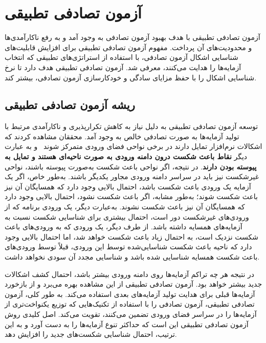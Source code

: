 \section{آزمون تصادفی تطبیقی}
آزمون تصادفی تطبیقی
 \cite{huang2019survey}
   با هدف بهبود آزمون تصادفی به وجود آمد و به رفع ناکارآمدی‌ها و محدودیت‌های آن پرداخت. مفهوم آزمون تصادفی تطبیقی برای افزایش قابلیت‌های شناسایی اشکال آزمون تصادفی، با استفاده از استراتژی‌های تطبیقی که انتخاب آزمایه‌ها را هدایت می‌کنند، معرفی شد. آزمون تصادفی تطبیقی هدف دارد تا نرخ شناسایی اشکال را با حفظ مزایای سادگی و خودکارسازی آزمون تصادفی، بیشتر کند.

\subsection{ریشه آزمون تصادفی تطبیقی}

توسعه آزمون تصادفی تطبیقی به دلیل نیاز به کاهش تکرارپذیری و ناکارآمدی مرتبط با تولید آزمایه‌ها به صورت تصادفی خالص به وجود آمد. محققان مشاهده کردند که اشکالات نرم‌افزار تمایل دارند در برخی نواحی فضای ورودی متمرکز شوند~\cite{white1980domain}\cite{ammann1988data}\cite{finelli1991nasa}\cite{bishopvariation}\cite{schneckenburger2007towards}
 و به عبارت دیگر \textbf{نقاط باعث شکست درون دامنه ورودی به صورت ناحیه‌ای هستند و تمایل به پیوسته بودن دارند}.
در نتیجه، اگر نواحی باعث شکست به‌صورت پیوسته باشند، نواحی غیرشکست نیز باید در سراسر دامنه ورودی مجاور یکدیگر باشند. به‌طور خاص، اگر یک آزمایه  یک ورودی باعث شکست باشد، احتمال بالایی وجود دارد که همسایگان آن نیز باعث شکست شوند؛ به‌طور مشابه، اگر  باعث شکست نشود، احتمال بالایی وجود دارد که همسایگان آن نیز باعث شکست نشوند. به‌عبارت دیگر، یک ورودی برنامه که از ورودی‌های غیرشکست دور است، احتمال بیشتری برای شناسایی شکست نسبت به آزمایه‌های همسایه داشته باشد. از طرف دیگر، یک ورودی که به ورودی‌های باعث شکست نزدیک است، به احتمال زیاد باعث شکست خواهد شد، اما احتمال بالایی وجود دارد که ناحیه باعث شکست شناسایی‌شده توسط این ورودی، قبلاً توسط ورودی‌های باعث شکست همسایه شناسایی شده باشد و شناسایی مجدد آن سودی نخواهد داشت.

 در نتیجه هر چه تراکم آزمایه‌ها روی دامنه ورودی بیشتر باشد، احتمال کشف اشکالات جدید بیشتر خواهد بود. آزمون تصادفی تطبیقی از این مشاهده بهره می‌برد و از بازخورد آزمایه‌ها قبلی برای هدایت تولید آزمایه‌های بعدی استفاده می‌کند. به طور کلی، آزمون تصادفی تطبیقی، آزمون تصادفی را با استفاده از تکنیک‌هایی که توزیع یکنواخت‌تری از آزمایه‌ها را در سراسر فضای ورودی تضمین می‌کنند، تقویت می‌کند. اصل کلیدی روش آزمون تصادفی تطبیقی این است که حداکثر تنوع آزمایه‌ها را به دست آورد و به این ترتیب، احتمال شناسایی شکست‌های جدید را افزایش دهد\cite{chen2010adaptive}.

